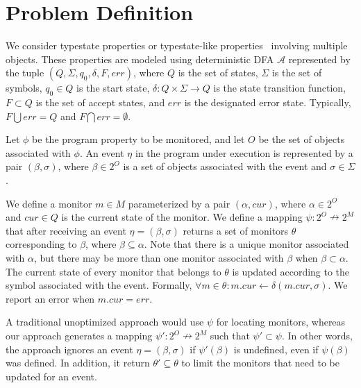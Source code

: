 \section{Problem Definition}
\label{sec:definition}

We consider typestate properties or typestate-like properties~ involving 
multiple objects. These properties are modeled using deterministic DFA 
$\mathcal{A}$ represented by the tuple $(Q, \Sigma, q_0, \delta, F, err)$, where 
$Q$ is the set of states, $\Sigma$ is the set of symbols, $q_0 \in Q$ is the 
start state, $\delta : Q \times \Sigma \to Q$ is the state transition function, 
$F \subset Q$ is the set of accept states, and $err$ is the designated error 
state. Typically, $F \bigcup err = Q$ and $F \bigcap err = \emptyset$. 

Let $\phi$ be the program property to be monitored, and let $O$ be the set of 
objects associated with $\phi$.  An event $\eta$ in the program under execution 
is represented by a pair $(\beta, \sigma)$, where $\beta \in 2^O$ is a set of 
objects associated with the event and $\sigma \in \Sigma$.

We define a monitor $m \in M$ parameterized by a pair $(\alpha, cur)$, where 
$\alpha \in 2^O$ and $cur \in Q$ is the current state of the monitor. We define 
a mapping $\psi : 2^O \nrightarrow 2^M$ that after receiving an event $\eta = 
(\beta, \sigma)$ returns a set of monitors $\theta$ corresponding to $\beta$, 
where $\beta \subseteq \alpha$. Note that there is a unique monitor associated
with $\alpha$, but there may be more than one monitor associated with $\beta$ 
when $\beta \subset \alpha$. The current state of every monitor that belongs to
$\theta$ is updated according to the symbol associated with the event. Formally, 
$\forall m \in \theta: m.cur \leftarrow \delta(m.cur, \sigma)$. We report an 
error when $m.cur = err$. 

 A traditional unoptimized approach would use $\psi$ 
for locating monitors, whereas our approach generates a mapping $\psi': 2^O 
\nrightarrow 2^M$ such that $\psi' \subset \psi$. In other words, the approach 
ignores an event $\eta = (\beta, \sigma)$ if $\psi'(\beta)$ is undefined, even 
if $\psi(\beta)$ was defined. In addition, it return $\theta' \subseteq \theta$ 
to limit the monitors that need to be updated for an event.

